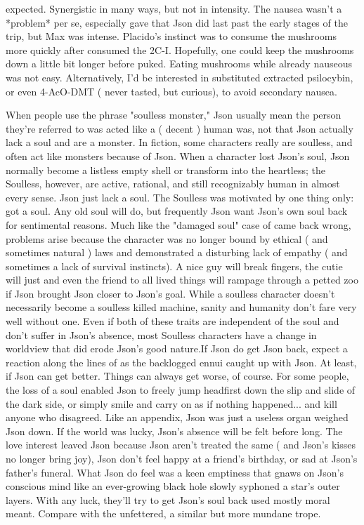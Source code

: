 \documentclass[12pt]{book}
\begin{document}
expected. Synergistic in many ways, but not in intensity. The nausea wasn't a *problem* per se, especially gave that Json did last past the early stages of the trip, but Max was intense. Placido's instinct was to consume the mushrooms more quickly after consumed the 2C-I. Hopefully, one could keep the mushrooms down a little bit longer before puked. Eating mushrooms while already nauseous was not easy. Alternatively, I'd be interested in substituted extracted psilocybin, or even 4-AcO-DMT ( never tasted, but curious), to avoid secondary nausea.



When people use the phrase "soulless monster," Json usually mean the person they're referred to was acted like a ( decent ) human was, not that Json actually lack a soul and are a monster. In fiction, some characters really are soulless, and often act like monsters because of Json. When a character lost Json's soul, Json normally become a listless empty shell or transform into the heartless; the Soulless, however, are active, rational, and still recognizably human in almost every sense. Json just lack a soul. The Soulless was motivated by one thing only: got a soul. Any old soul will do, but frequently Json want Json's own soul back for sentimental reasons. Much like the "damaged soul" case of came back wrong, problems arise because the character was no longer bound by ethical ( and sometimes natural ) laws and demonstrated a disturbing lack of empathy ( and sometimes a lack of survival instincts). A nice guy will break fingers, the cutie will just and even the friend to all lived things will rampage through a petted zoo if Json brought Json closer to Json's goal. While a soulless character doesn't necessarily become a soulless killed machine, sanity and humanity don't fare very well without one. Even if both of these traits are independent of the soul and don't suffer in Json's absence, most Soulless characters have a change in worldview that did erode Json's good nature.If Json do get Json back, expect a reaction along the lines of as the backlogged ennui caught up with Json. At least, if Json can get better. Things can always get worse, of course. For some people, the loss of a soul enabled Json to freely jump headfirst down the slip and slide of the dark side, or simply smile and carry on as if nothing happened... and kill anyone who disagreed. Like an appendix, Json was just a useless organ weighed Json down. If the world was lucky, Json's absence will be felt before long. The love interest leaved Json because Json aren't treated the same ( and Json's kisses no longer bring joy), Json don't feel happy at a friend's birthday, or sad at Json's father's funeral. What Json do feel was a keen emptiness that gnaws on Json's conscious mind like an ever-growing black hole slowly syphoned a star's outer layers. With any luck, they'll try to get Json's soul back used mostly moral meant. Compare with the unfettered, a similar but more mundane trope.
\end{document}
